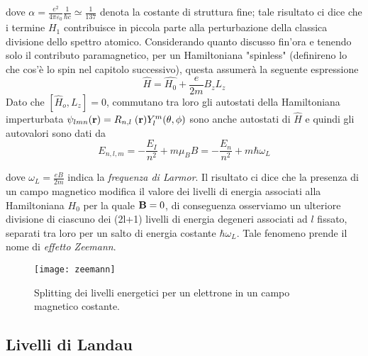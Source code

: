 dove $\alpha = \frac{e^2}{4\pi \varepsilon_0} \frac{1}{\hbar c} \simeq \frac{1}{137}$ denota la costante di struttura fine; tale risultato ci dice che i termine $H_1$ contribuisce in piccola parte alla perturbazione della classica divisione dello spettro atomico. Considerando quanto discusso fin'ora e tenendo solo il contributo paramagnetico, per un Hamiltoniana "spinless" (definireno lo che cos'\`e lo spin nel capitolo successivo), questa assumer\`a la seguente espressione
\begin{equation}
	\hat{H} = \hat{H_0} + \frac{e}{2m}B_zL_z
\end{equation}
Dato che $[\hat{H}_o,L_z] = 0$, commutano tra loro gli autostati della Hamiltoniana imperturbata $\psi_{lmn}(\bold{r})= R_{n,l}\;(\bold{r})Y_{l}^{m}(\theta,\phi)$ sono anche autostati di $\hat{H}$ e quindi gli autovalori sono dati da 
\begin{equation}
	E_{n,l,m} = -\frac{E_I}{n^2} + m\mu_B B = -\frac{E_n}{n^2} + m\hbar\omega_L
\end{equation}
\newpage 

dove $\omega_L = \frac{eB}{2m}$ indica la \textit{frequenza di Larmor}. Il risultato ci dice che la presenza di un campo magnetico modifica il valore dei livelli di energia associati alla Hamiltoniana $H_0$ per la quale $\bold{B} = 0$, di conseguenza osserviamo un ulteriore divisione di ciascuno dei (2l+1) livelli di energia degeneri associati ad $l$ fissato, separati tra loro per un salto di energia costante $\hbar \omega_L$. Tale fenomeno prende il nome di \textit{effetto Zeemann}.

\begin{figure}[!ht]
\vspace{0.4in}
\texttt{[image: zeemann]}	
\centering
\vspace{0.3in}
\caption{Splitting dei livelli energetici per un elettrone in un campo magnetico costante.}
\end{figure}

\subsection{Livelli di Landau}

